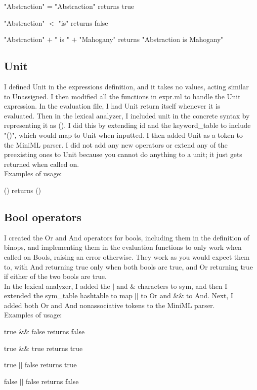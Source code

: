 \documentclass{article}
\begin{document}
 "Abstraction" = "Abstraction" returns true
 
 "Abstraction" $<$ "is" returns false
 
 "Abstraction" $+$ " is " $+$ "Mahogany" returns "Abstraction is Mahogany"
 
\subsection*{Unit}
 I defined Unit in the expressions definition, and it takes no values, acting similar to Unassigned. I then modified all the functions in expr.ml to handle the Unit expression. In the evaluation file, I had Unit return itself whenever it is evaluated. Then in the lexical analyzer, I included unit in the concrete syntax by representing it as (). I did this by extending id and the keyword\_table to include "()", which would map to Unit when inputted. I then added Unit as a token to the MiniML parser. I did not add any new operators or extend any of the preexisting ones to Unit because you cannot do anything to a unit; it just gets returned when called on.
 \newline
 \\ Examples of usage:
 
    () returns ()
 
\subsection*{Bool operators}
 I created the Or and And operators for bools, including them in the definition of binops, and implementing them in the evaluation functions to only work when called on Bools, raising an error otherwise. They work as you would expect them to, with And returning true only when both bools are true, and Or returning true if either of the two bools are true.
 \newline
 \\ In the lexical analyzer, I added the $|$ and \& characters to sym, and then I extended the sym\_table hashtable to map $||$ to Or and \&\& to And. Next, I added both Or and And nonassociative tokens to the MiniML parser.
 \newline
 \\ Examples of usage:
 
    true \&\& false returns false
    
    true \&\& true returns true
    
    true $||$ false returns true
    
    false $||$ false returns false

 
\end{document}
